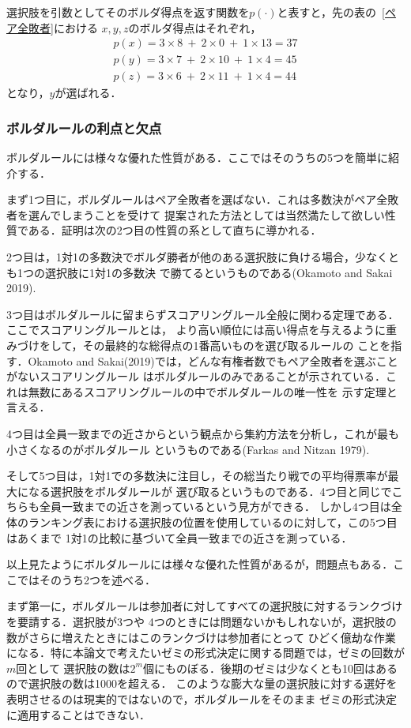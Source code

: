 \documentclass[dvipdfmx]{jsarticle}
\begin{document}
選択肢を引数としてそのボルダ得点を返す関数を$p(\cdot)$と表すと，先の表の~\ref{ペア全敗者}における
$x,y,z$のボルダ得点はそれぞれ，
\begin{align*}
  p(x) = 3 \times 8 \ + \ 2 \times 0 \ + \ 1 \times 13 = 37 \\
  p(y) = 3 \times 7 \ + \ 2 \times 10 \ + \ 1 \times 4 = 45 \\
  p(z) = 3 \times 6 \ + \ 2 \times 11 \ + \ 1 \times 4 = 44
\end{align*}
となり，$y$が選ばれる．

\subsubsection{ボルダルールの利点と欠点}\label{ボルダルールの利点と欠点}
ボルダルールには様々な優れた性質がある．ここではそのうちの5つを簡単に紹介する．

まず1つ目に，ボルダルールはペア全敗者を選ばない．これは多数決がペア全敗者を選んでしまうことを受けて
提案された方法としては当然満たして欲しい性質である．証明は次の2つ目の性質の系として直ちに導かれる．

2つ目は，1対1の多数決でボルダ勝者が他のある選択肢に負ける場合，少なくとも1つの選択肢に1対1の多数決
で勝てるというものである(Okamoto and Sakai 2019).

3つ目はボルダルールに留まらずスコアリングルール全般に関わる定理である．ここでスコアリングルールとは，
より高い順位には高い得点を与えるように重みづけをして，その最終的な総得点の1番高いものを選び取るルールの
ことを指す．Okamoto and Sakai(2019)では，どんな有権者数でもペア全敗者を選ぶことがないスコアリングルール
はボルダルールのみであることが示されている．これは無数にあるスコアリングルールの中でボルダルールの唯一性を
示す定理と言える．

4つ目は全員一致までの近さからという観点から集約方法を分析し，これが最も小さくなるのがボルダルール
というものである(Farkas and Nitzan 1979).

そして5つ目は，1対1での多数決に注目し，その総当たり戦での平均得票率が最大になる選択肢をボルダルールが
選び取るというものである．4つ目と同じでこちらも全員一致までの近さを測っているという見方ができる．
しかし4つ目は全体のランキング表における選択肢の位置を使用しているのに対して，この5つ目はあくまで
1対1の比較に基づいて全員一致までの近さを測っている．

以上見たようにボルダルールには様々な優れた性質があるが，問題点もある．ここではそのうち2つを述べる．

まず第一に，ボルダルールは参加者に対してすべての選択肢に対するランクづけを要請する．選択肢が3つや
4つのときには問題ないかもしれないが，選択肢の数がさらに増えたときにはこのランクづけは参加者にとって
ひどく億劫な作業になる．特に本論文で考えたいゼミの形式決定に関する問題では，ゼミの回数が$m$回として
選択肢の数は$2^m$個にものぼる．後期のゼミは少なくとも10回はあるので選択肢の数は1000を超える．
このような膨大な量の選択肢に対する選好を表明させるのは現実的ではないので，ボルダルールをそのまま
ゼミの形式決定に適用することはできない．
\end{document}
